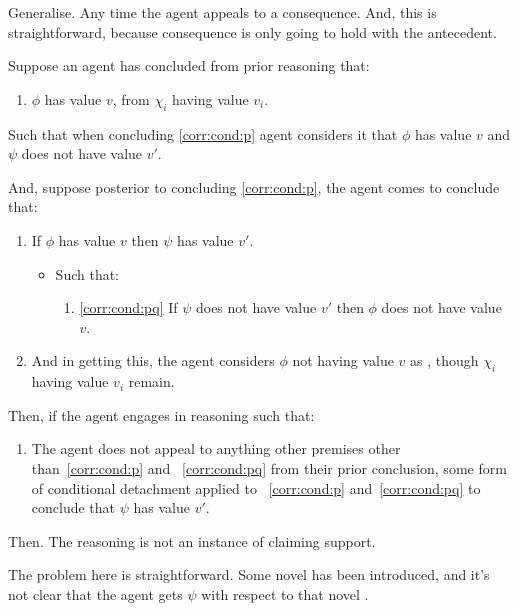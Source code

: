 \begin{note}
  Generalise.
  Any time the agent appeals to a consequence.
  And, this is straightforward, because consequence is only going to hold with the antecedent.

  \begin{corollary}\label{corr:eiS:C:contraposition}
    Suppose an agent has concluded from prior reasoning that:
    \begin{enumerate}[label=\arabic*., ref=(\arabic*)]
    \item
      \label{corr:cond:p}
      \(\phi\) has value \(v\), from \(\chi_{i}\) having value \(v_{i}\).
    \end{enumerate}
    Such that when concluding \ref{corr:cond:p} agent considers it \epVAd{} that \(\phi\) has value \(v\) and \(\psi\) does not have value \(v'\).

    And, suppose posterior to concluding \ref{corr:cond:p}, the agent comes to conclude that:
    \begin{enumerate}[label=\arabic*., ref=(\arabic*), resume]
    \item
      \label{corr:cond:pq}
      If \(\phi\) has value \(v\) then \(\psi\) has value \(v'\).
      \begin{itemize}
      \item Such that:
        \begin{enumerate}
        \item \ref{corr:cond:pq}
          If \(\psi\) does not have value \(v'\) then \(\phi\) does not have value \(v\).
        \end{enumerate}
      \end{itemize}
    \item
      And in getting this, the agent considers \(\phi\) not having value \(v\) as \epVAd{}, though \(\chi_{i}\) having value \(v_{i}\) remain.
    \end{enumerate}

    Then, if the agent engages in reasoning such that:
    \begin{enumerate}[label=\arabic*., ref=(\arabic*), resume]
    \item
      The agent does not appeal to anything other premises other than~\ref{corr:cond:p} and ~\ref{corr:cond:pq} from their prior conclusion, some form of conditional detachment applied to ~\ref{corr:cond:p} and~\ref{corr:cond:pq} to conclude that \(\psi\) has value \(v'\).
    \end{enumerate}
    Then.
    The reasoning is not an instance of claiming support.
  \end{corollary}
  {
    \color{blue}
    The problem here is straightforward.
    Some novel \epVAd{} has been introduced, and it's not clear that the agent gets \(\psi\) with respect to that novel \epVAd{}.

}
\end{note}
